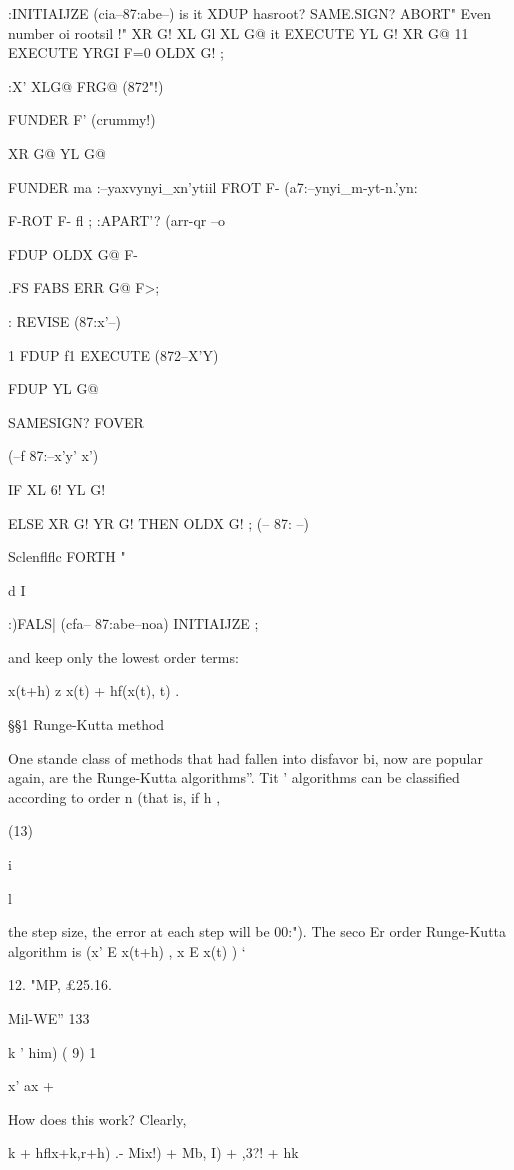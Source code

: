 {:INITIAIJZE (cia--87:abe--)
is it \storecia
XDUP \interval hasroot?
SAME.SIGN?
ABORT" Even number oi rootsil !"
XR G! XL Gl
XL G@ it EXECUTE YL G!
XR G@ 11 EXECUTE YRGI
F=0 OLDX G! ;

 

:X' XLG@ FRG@ (872"!)

FUNDER F' (crummy!)

XR G@ YL G@

FUNDER ma :--yaxvynyi_xn'ytiil
FROT F- (a7:--ynyi_m-yt-n.'yn:

F-ROT F- fl ;
:APART'? (arr-qr --o

FDUP OLDX G@ F-

.FS FABS ERR G@ F>;

: REVISE (87:x'--)

1
FDUP f1 EXECUTE (872--X'Y)

FDUP YL G@

SAMESIGN? FOVER

(--f 87:--x'y' x')

IF XL 6! YL G!

ELSE XR G! YR G! THEN
OLDX G! ; (-- 87: --)

Sclenflflc FORTH "

d
I

 

:)FALS| (cfa-- 87:abe--noa) INITIAIJZE ;

and keep only the lowest order terms:

x(t+h) z x(t) + hf(x(t), t) .

§§1 Runge-Kutta method

One stande class of methods that had fallen into disfavor bi,
now are popular again, are the Runge-Kutta algorithms”. Tit '
algorithms can be classified according to order n (that is, if h ,

(13)

i

 

l

the step size, the error at each step will be 00:"). The seco Er
order Runge-Kutta algorithm is (x' E x(t+h) , x E x(t) ) ‘

 

12. "MP, £25.16.

Mil-WE” 133

k ' him) ( 9)
1

x' ax + %

How does this work? Clearly,

k + hflx+k,r+h) .- Mix!) + Mb, I) + ,3?! + hk %

}
